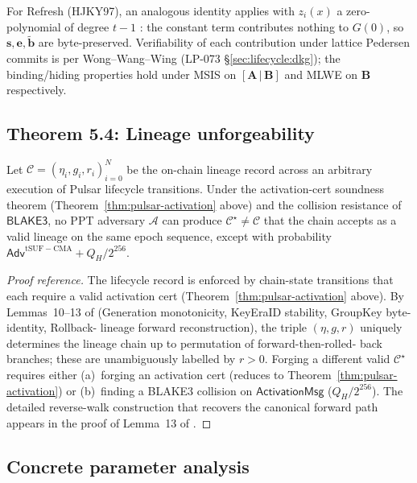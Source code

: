 For Refresh (HJKY97), an analogous identity applies with $z_i(x)$ a
zero-polynomial of degree $t-1$ \cite{hjky97}: the constant term
contributes nothing to $G(0)$, so $\mathbf{s}, \mathbf{e},
\tilde{\mathbf{b}}$ are byte-preserved. Verifiability of each
contribution under lattice Pedersen commits is per
Wong--Wang--Wing \cite{wongwangwing02} (LP-073
\S\ref{sec:lifecycle:dkg}); the binding/hiding properties hold under
MSIS on $[\mathbf{A}\,|\,\mathbf{B}]$ and MLWE on $\mathbf{B}$
respectively.

\subsection{Theorem 5.4: Lineage unforgeability}
\label{sec:security:thm54}

\begin{theorem}
\label{thm:pulsar-lineage}
Let $\mathcal{C} = (\eta_i, g_i, r_i)_{i=0}^{N}$ be the on-chain
lineage record across an arbitrary execution of Pulsar lifecycle
transitions. Under the activation-cert soundness theorem
(Theorem~\ref{thm:pulsar-activation} above) and the collision
resistance of $\mathsf{BLAKE3}$, no PPT adversary $\mathcal{A}$ can
produce
$\mathcal{C}^\star \neq \mathcal{C}$ that the chain accepts as a valid
lineage on the same epoch sequence, except with probability
$\mathsf{Adv}^{\mathrm{tSUF-CMA}} + Q_H / 2^{256}$.
\end{theorem}

\begin{proof}[Proof reference]
The lifecycle record is enforced by chain-state transitions that each
require a valid activation cert (Theorem~\ref{thm:pulsar-activation}
above). By Lemmas~10--13 of \cite{quasarcertsoundness} (Generation
monotonicity, KeyEraID stability, GroupKey byte-identity, Rollback-
lineage forward reconstruction), the triple $(\eta, g, r)$ uniquely
determines the lineage chain up to permutation of forward-then-rolled-
back branches; these are unambiguously labelled by $r > 0$. Forging a
different valid $\mathcal{C}^\star$ requires either (a)~forging an
activation cert (reduces to Theorem~\ref{thm:pulsar-activation}) or
(b)~finding a BLAKE3 collision on $\mathsf{ActivationMsg}$
($Q_H / 2^{256}$). The detailed reverse-walk construction that
recovers the canonical forward path appears in the proof of
Lemma~13 of \cite{quasarcertsoundness}.
\end{proof}

\subsection{Concrete parameter analysis}
\label{sec:security:concrete}


